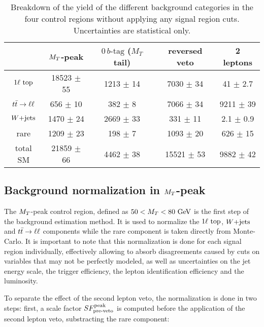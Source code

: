 \begin{table}[h!]
    \centering
\begin{tabular}{|c|cccc|}
    \hline
                     & $M_T$-peak       & $0\, b\text{-tag}$ ($M_T$ tail) & reversed veto    & 2 leptons             \\
    \hline
     $1\ell~\text{top}$ & 18523 $\pm$ 55   &  1213 $\pm$ 14        &  7030 $\pm$ 34   &   41 $\pm$ 2.7  \\
     $t\bar{t} \rightarrow \ell \ell$  &   656 $\pm$ 10   &   382 $\pm$ 8         &  7066 $\pm$ 34   & 9211 $\pm$ 39   \\
     $\text{$W$+jets}$        &  1470 $\pm$ 24   &  2669 $\pm$ 33        &   331 $\pm$ 11   &  2.1 $\pm$ 0.9  \\
     rare            &  1209 $\pm$ 23   &   198 $\pm$ 7         &  1093 $\pm$ 20   &  626 $\pm$ 15   \\
    \hline
     total SM        & 21859 $\pm$ 66   &  4462 $\pm$ 38        & 15521 $\pm$ 53   & 9882 $\pm$ 42   \\
    \hline
\end{tabular}
    \caption{Breakdown of the yield of the different background categories in the four
    control regions without applying any signal region cuts. Uncertainties are statistical only.}
    \label{tab:cutflowControlRegions}
\end{table}

        \subsection{Background normalization in $M_T$-peak \label{sec:MTpeakNormalization}}

    The $M_T$-peak control region, defined as $50 < M_T < 80 ~\text{GeV}$ is the first step of the
    background estimation method. It is used to normalize the $1\ell~\text{top}$, $\text{$W$+jets}$ and
    $t\bar{t} \rightarrow \ell \ell$ components while the rare component is taken directly from Monte-Carlo.
    It is important to note that this normalization is done for each signal region individually,
    effectively allowing to absorb disagreements caused by cuts on variables that may not
    be perfectly modeled, as well as uncertainties on the jet energy scale, the trigger efficiency,
    the lepton identification efficiency and the luminosity.

    To separate the effect of the second lepton veto, the  normalization is done in two
    steps: first, a scale factor $SF_{\text{pre-veto}}^{\text{peak}}$ is computed before the application of the
    second lepton veto, substracting the rare component:

